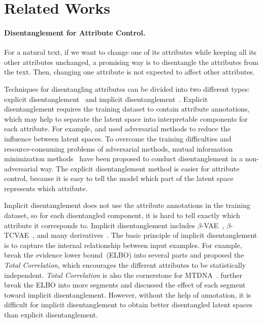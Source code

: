\documentclass[11pt,a4paper]{article}
\renewcommand{\cite}{\citep}
\begin{document}
\section{Related Works}
\paragraph{Disentanglement for Attribute Control.}
For a natural text, if we want to change one of its attributes while keeping all its other attributes unchanged, a promising way is to disentangle the attributes from the text. Then, changing one attribute is  not expected to affect other attributes. %

Techniques for disentangling attributes can be divided into two different types: explicit disentanglement~\cite{chen2016infogan,john-etal-2019-disentangled,sha2021multi} and implicit disentanglement~\cite{higgins2017beta,chen2018isolating}. Explicit disentanglement requires  the training dataset to contain attribute annotations, which may help to separate the latent space into interpretable components for each attribute. For example,  and  used adversarial methods to reduce the influence between latent spaces. To overcome the training difficulties and resource-consuming problems of adversarial methods, mutual information minimization methods~\cite{moyer2018invariant,sha2021multi} have been proposed  to conduct disentanglement in a non-adversarial way.
The explicit disentanglement method is easier for attribute control,  because it is easy to tell the model which part of the latent space represents which  attribute. 

Implicit disentanglement does not use the attribute annotations in the training dataset, so for each disentangled component, it is hard to tell exactly which attribute it corresponds to. Implicit disentanglement includes $\beta$-VAE~\cite{higgins2017beta}, $\beta$-TCVAE~\cite{chen2018isolating}, and many derivatives~\cite{mathieu2018disentangling,kumar2017variational,esmaeili2018structured,hoffman2016elbo,narayanaswamy2017learning,kim2018disentangling,shao2020controlvae}. The basic principle of implicit disentanglement is to capture the internal relationship between input examples. For example,  break the  evidence lower bound~(ELBO) into several parts and proposed the \emph{Total Correlation}, which  encourages the different  attributes to be statistically independent.  \emph{Total Correlation} is also the cornerstone for MTDNA~\cite{sha2021multi}.  further break the ELBO into more segments and discussed the effect of each segment toward implicit disentanglement. However, without the help of annotation, it is difficult for implicit disentanglement to obtain better disentangled latent spaces than  explicit disentanglement.
\end{document}
